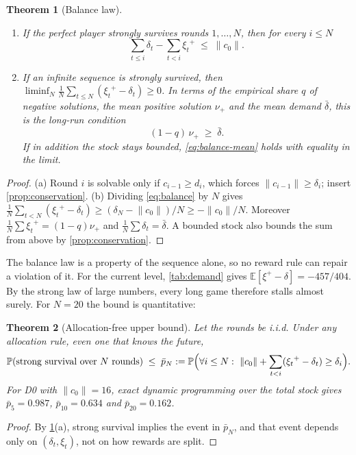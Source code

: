\documentclass[11pt,a4paper]{article}
\newtheorem{theorem}{Theorem}[section]
\theoremstyle{definition}
\theoremstyle{remark}
\newcommand{\E}{\mathbb{E}}
\renewcommand{\P}{\mathbb{P}}
\newcommand{\norm}[1]{\lVert #1\rVert}
\newcommand{\pos}[1]{{#1}^{+}}
\begin{document}
\begin{theorem}[Balance law]\label{thm:balance}
\leavevmode
\begin{enumerate}[label=(\alph*),nosep]
\item If the perfect player strongly survives rounds $1,\dots,N$, then for every $i\le N$
  \begin{equation}\label{eq:balance}
  \sum_{t\le i}\delta_t-\sum_{t<i}\pos{\xi_t}\;\le\;\norm{c_0}.
  \end{equation}
\item If an infinite sequence is strongly survived, then
  $\liminf_N\frac1N\sum_{t\le N}(\pos{\xi_t}-\delta_t)\ge0$. In terms of the empirical
  share $q$ of negative solutions, the mean positive solution $\nu_+$ and the mean
  demand $\bar\delta$, this is the long-run condition
  \begin{equation}\label{eq:balance-mean}
  (1-q)\,\nu_+\;\ge\;\bar\delta .
  \end{equation}
  If in addition the stock stays bounded, \eqref{eq:balance-mean} holds with equality in
  the limit.
\end{enumerate}
\end{theorem}
\begin{proof}
(a) Round $i$ is solvable only if $c_{i-1}\ge d_i$, which forces
$\norm{c_{i-1}}\ge\delta_i$; insert \cref{prop:conservation}.
(b) Dividing \eqref{eq:balance} by $N$ gives
$\frac1N\sum_{t<N}(\pos{\xi_t}-\delta_t)\ge(\delta_N-\norm{c_0})/N\ge-\norm{c_0}/N$.
Moreover $\frac1N\sum\pos{\xi_t}=(1-q)\nu_+$ and $\frac1N\sum\delta_t=\bar\delta$.
A bounded stock also bounds the sum from above by \cref{prop:conservation}.
\end{proof}

The balance law is a property of the sequence alone, so no reward rule can repair a
violation of it. For the current level, \cref{tab:demand} gives
$\E[\pos\xi-\delta]=-457/404$. By the strong law of large numbers, every long game
therefore stalls almost surely. For $N=20$ the bound is quantitative:

\begin{theorem}[Allocation-free upper bound]\label{thm:allocfree}
Let the rounds be i.i.d. Under \emph{any} allocation rule, even one that knows the
future,
\[
\P(\text{strong survival over }N\text{ rounds})\;\le\;
\bar p_N:=\P\Bigl(\forall i\le N:\ \norm{c_0}+\sum_{t<i}(\pos{\xi_t}-\delta_t)\ge\delta_i\Bigr).
\]
For D0 with $\norm{c_0}=16$, exact dynamic programming over the total stock gives
$\bar p_5=0.987$, $\bar p_{10}=0.634$ and $\bar p_{20}=0.162$.
\end{theorem}
\begin{proof}
By \cref{thm:balance}(a), strong survival implies the event in $\bar p_N$, and that event
depends only on $(\delta_t,\xi_t)$, not on how rewards are split.
\end{proof}
\end{document}
